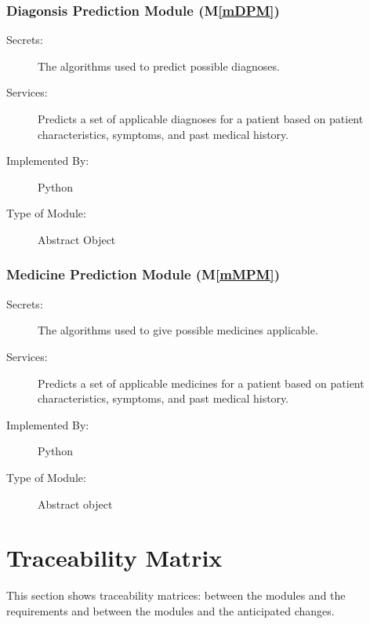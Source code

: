 \documentclass[12pt, titlepage]{article}
\newcommand{\mref}[1]{M\ref{#1}}
\begin{document}
\subsubsection{Diagonsis Prediction Module (\mref{mDPM})}

\begin{description}
\item[Secrets:]The algorithms used to predict possible diagnoses.
\item[Services:]Predicts a set of applicable diagnoses for a patient based on patient characteristics, symptoms, and past medical history.
\item[Implemented By:]Python
\item[Type of Module:]Abstract Object
\end{description}

\subsubsection{Medicine Prediction Module (\mref{mMPM})}

\begin{description}
\item[Secrets:]The algorithms used to give possible medicines applicable.
\item[Services:]Predicts a set of applicable medicines for a patient based on patient characteristics, symptoms, and past medical history.
\item[Implemented By:]Python
\item[Type of Module:]Abstract object
\end{description}


\section{Traceability Matrix} \label{SecTM}

This section shows traceability matrices: between the modules and the requirements and between the modules and the anticipated changes.
\end{document}
